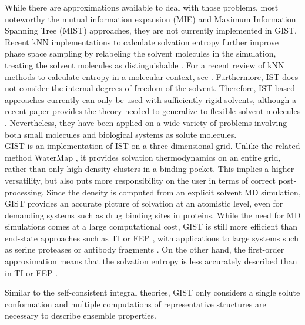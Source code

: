 \documentclass[9pt,tutorial]{livecoms}
\begin{document}
While there are approximations available to deal with those problems, most noteworthy the mutual information expansion (MIE) and Maximum Information Spanning Tree (MIST) approaches, they are not currently implemented in GIST. 
Recent kNN implementations to calculate solvation entropy further improve phase space sampling by relabeling the solvent molecules in the simulation, treating the solvent molecules as distinguishable \cite{reinhard2007estimation,heinz2019computing,heinz2021permut,fogolari2021optimal}. 
For a recent review of kNN methods to calculate entropy in a molecular context, see \cite{fogolari2024k}.
Furthermore, IST does not consider the internal degrees of freedom of the solvent.
Therefore, IST-based approaches currently can only be used with sufficiently rigid solvents, although a recent paper provides the theory needed to generalize to flexible solvent molecules \cite{gilson2024freeenergy}.
Nevertheless, they have been applied on a wide variety of problems involving both small molecules and biological systems as solute molecules.\\
GIST is an implementation of IST on a three-dimensional grid. 
Unlike the related method WaterMap \cite{Abel2008-watermap,Young2007-watermap}, it provides solvation thermodynamics on an entire grid, rather than only high-density clusters in a binding pocket.
This implies a higher versatility, but also puts more responsibility on the user in terms of correct post-processing.
Since the density is computed from an explicit solvent MD simulation, GIST provides an accurate picture of solvation at an atomistic level, even for demanding systems such as drug binding sites in proteins.
While the need for MD simulations comes at a large computational cost, GIST is still more efficient than end-state approaches such as TI \cite{Kirkwood1935-ti} or FEP \cite{Zwanzig1954-reweighting}, with applications to large systems such as serine proteases \cite{Kraml2019-gigist} or antibody fragments \cite{Waibl2021-gist-antibodies}.
On the other hand, the first-order approximation means that the solvation entropy is less accurately described than in TI or FEP \cite{Chen2021,Waibl2021-gist-salt}. 

Similar to the self-consistent integral theories, GIST only considers a single solute conformation and multiple computations of representative structures are necessary to describe ensemble properties. 
\end{document}
